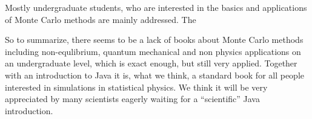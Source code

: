 
Mostly undergraduate students, who are interested in the basics and 
applications of Monte Carlo methods are mainly addressed. 
The



So to summarize, there seems to be a lack of books about Monte Carlo 
methods including non-equlibrium, quantum mechanical and non 
physics applications on an undergraduate level, which is exact enough, 
but still very applied. Together with an introduction to Java it is, what
we think, a standard book for all people interested in simulations
in statistical physics. We think it will be very appreciated by many
scientists eagerly waiting for a ``scientific'' Java introduction.
